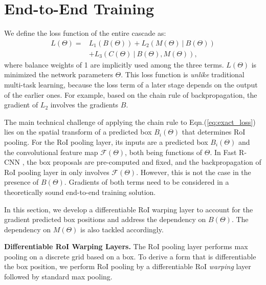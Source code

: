 \documentclass[10pt,twocolumn,letterpaper]{article}
\begin{document}
\section{End-to-End Training}
\label{sec:training}

We define the loss function of the entire cascade as:
\begin{equation}
\begin{aligned}
L(\Theta) = & L_1(B(\Theta)) + L_2(M(\Theta)~|~B(\Theta)) \\
			 & + L_3(C(\Theta)~|~B(\Theta), M(\Theta)),
\end{aligned}
\label{eq:exact_loss}
\end{equation}
where balance weights of 1 are implicitly used among the three terms.
$L(\Theta)$ is minimized \wrt the network parameters $\Theta$.
This loss function is \emph{unlike} traditional multi-task learning, because the loss term of a later stage depends on the output of the earlier ones. For example, based on the chain rule of backpropagation, the gradient of $L_2$ involves the gradients \wrt $B$.

The main technical challenge of applying the chain rule to Eqn.(\ref{eq:exact_loss}) lies on the spatial transform of a predicted box $B_i(\Theta)$ that determines RoI pooling. For the RoI pooling layer, its inputs are a predicted box $B_i(\Theta)$ and the convolutional feature map $\mathcal{F}(\Theta)$, both being functions of $\Theta$. In Fast R-CNN \cite{Girshick2015}, the box proposals are pre-computed and fixed, and the backpropagation of RoI pooling layer in \cite{Girshick2015} only involves $\mathcal{F}(\Theta)$. However, this is not the case in the presence of $B(\Theta)$. Gradients of both terms need to be considered in a theoretically sound end-to-end training solution.

In this section, we develop a differentiable RoI warping layer to account for the gradient \wrt predicted box positions and address the dependency on $B(\Theta)$. The dependency on $M(\Theta)$ is also tackled accordingly.

\vspace{.5em}
\noindent\textbf{Differentiable RoI Warping Layers.}
The RoI pooling layer \cite{Girshick2015,He2014} performs max pooling on a discrete grid based on a box. To derive a form that is differentiable \wrt the box position, we perform RoI pooling by a differentiable RoI \emph{warping} layer followed by standard max pooling.
\end{document}
